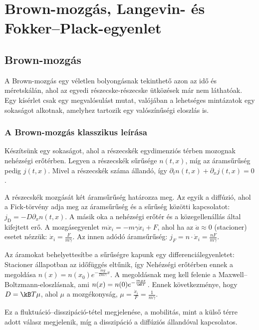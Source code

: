 \chapter{Brown-mozg\'as, Langevin- \'es Fokker--Plack-egyenlet}
 
 \section{Brown-mozgás}
  
  A Brown-mozgás egy véletlen bolyongásnak tekinthető azon az idő és méretskálán, ahol az egyedi részecske-részecske ütközések már nem láthatóak.
   Egy kísérlet csak egy megvalósulást mutat, valójában a lehetséges mintázatok egy sokaságot alkotnak, amelyhez tartozik egy valószínűségi eloszlás is.
  
  \subsection{A Brown-mozgás klasszikus leírása}
   
   Készítsünk egy sokaságot, ahol a részecskék egydimenziós térben mozognak nehézségi erőtérben.
   Legyen a részecskék sűrűsége $n(t,x)$, míg az áramsűrűség pedig $j(t,x)$.
   Mivel a részecskék száma állandó, így $\partial_t n(t,x)+\partial_x j(t,x)=0$. 
   
   A részecskék mozgását két áramsűrűség határozza meg.
   Az egyik a diffúzió, ahol a Fick-törvény adja meg az áramsűrűség és a sűrűség közötti kapcsolatot: $j_\text{D}=-D\partial_x n(t,x)$.
   A másik oka a nehézségi erőtér és a közegellenállás által kifejtett erő.
   A mozgásegyenlet $m\ddot x_i=-m\gamma\dot x_i+F$, ahol ha az $\ddot a\approx 0$ (stacioner) esetet nézzük: $\dot x_i=\frac{F}{m\gamma}$.
   Az innen adódó áramsűrűség: $j_ F=n\cdot \dot x_i=\frac{nF}{m\gamma}$. 
   
   Az áramokat behelyettesítbe a sűrűségre kapunk egy differenciálegyenletet:
   Stacioner állapotban az időfüggés eltűnik, így 
   Nehézségi erőtérben ennek a megoldása $n(x)=n(x_0)e^{-\frac{mg}{D m\gamma}x}$.
   A megoldásnak meg kell felenie a Maxwell--Boltz\-mann-eloszlásnak, ami $n(x)=n(0)e^{-\frac{mgx}{\kB T}}$.
   Ennek következménye, hogy $D=\kB T\mu$, ahol $\mu$ a mozgékonyság, $\mu=\frac{\dot x_i}{F}=\frac{1}{m\gamma}$.
   
   Ez a fluktuáció--disszipáció-tétel megjelenése, a mobilitás, mint a külső térre adott válasz megjelenik, míg a disszipáció a diffúziós állandóval kapcsolatos. 
   
